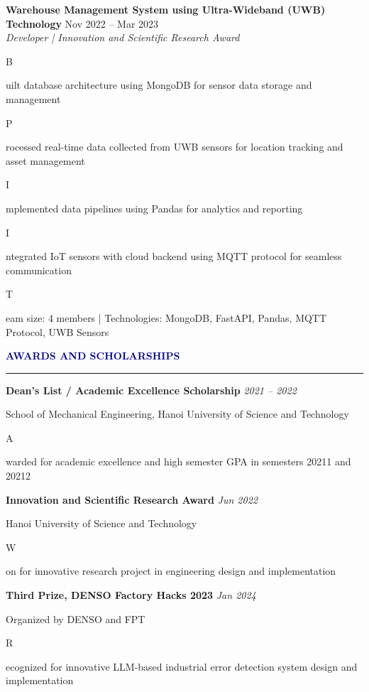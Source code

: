 \documentclass[11pt,letterpaper]{article}
\newcommand{\section}[1]{
  \vspace{0.3em}
  {\large\textbf{\textcolor{darkblue}{#1}}}
  \vspace{0.2em}
  \hrule
  \vspace{0.3em}
}
\newcommand{\subsection}[2]{
  \textbf{#1} \hfill \textit{#2}
  \vspace{0.2em}
}
\newcommand{\entry}[4]{
  \textbf{#1} \hfill #2 \\
  \textit{#3} \\
  #4
  \vspace{0.3em}
}
\newcommand{\item}[1]{
  \begin{itemize}[leftmargin=1.5em, topsep=0pt, itemsep=0.2em]
    #1
  \end{itemize}
}
\begin{document}
\entry
  {Warehouse Management System using Ultra-Wideband (UWB) Technology}
  {Nov 2022 -- Mar 2023}
  {Developer | Innovation and Scientific Research Award}
  {
    \begin{itemize}[leftmargin=1.5em, topsep=0pt, itemsep=0.2em]
      \item Built database architecture using MongoDB for sensor data storage and management
      \item Processed real-time data collected from UWB sensors for location tracking and asset management
      \item Implemented data pipelines using Pandas for analytics and reporting
      \item Integrated IoT sensors with cloud backend using MQTT protocol for seamless communication
      \item Team size: 4 members | Technologies: MongoDB, FastAPI, Pandas, MQTT Protocol, UWB Sensors
    \end{itemize}
  }

\section{AWARDS AND SCHOLARSHIPS}

\subsection{Dean's List / Academic Excellence Scholarship}{2021 -- 2022}
School of Mechanical Engineering, Hanoi University of Science and Technology
\begin{itemize}[leftmargin=1.5em, topsep=0pt, itemsep=0.2em]
  \item Awarded for academic excellence and high semester GPA in semesters 20211 and 20212
\end{itemize}

\subsection{Innovation and Scientific Research Award}{Jun 2022}
Hanoi University of Science and Technology
\begin{itemize}[leftmargin=1.5em, topsep=0pt, itemsep=0.2em]
  \item Won for innovative research project in engineering design and implementation
\end{itemize}

\subsection{Third Prize, DENSO Factory Hacks 2023}{Jan 2024}
Organized by DENSO and FPT
\begin{itemize}[leftmargin=1.5em, topsep=0pt, itemsep=0.2em]
  \item Recognized for innovative LLM-based industrial error detection system design and implementation
\end{itemize}
\end{document}
